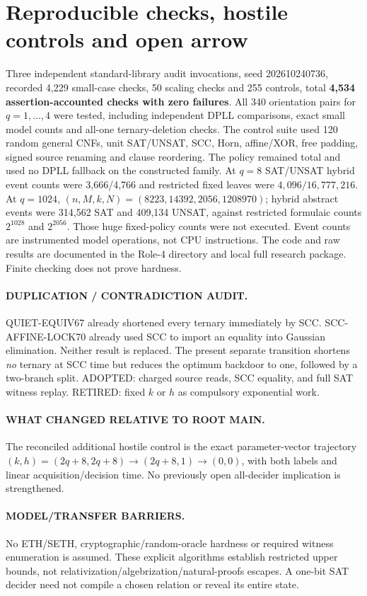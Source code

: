 \documentclass[11pt]{article}
\begin{document}
\section{Reproducible checks, hostile controls and open arrow}
Three independent standard-library audit invocations, seed
202610240736, recorded 4,229 small-case checks,
50 scaling checks and 255 controls, total
\textbf{4,534 assertion-accounted checks with zero failures}.
All 340 orientation pairs for $q=1,\ldots,4$ were tested, including
independent DPLL comparisons, exact small model counts and
all-one ternary-deletion checks. The control suite used 120
random general CNFs, unit SAT/UNSAT, SCC, Horn, affine/XOR,
free padding, signed source renaming and clause reordering.
The policy remained total and used no DPLL fallback on the constructed
family. At $q=8$ SAT/UNSAT hybrid event counts were
3,666/4,766 and restricted fixed leaves were
$4,096/16,777,216$. At $q=1024$,
$(n,M,k,N)=(8223,14392,2056,1208970)$;
hybrid abstract events were 314,562 SAT and 409,134 UNSAT,
against restricted formulaic counts $2^{1028}$ and $2^{2056}$.
Those huge fixed-policy counts were not executed. Event counts
are instrumented model operations, not CPU instructions.
The code and raw results are documented in the Role-4 directory
and local full research package. Finite checking does not prove hardness.

\paragraph{DUPLICATION / CONTRADICTION AUDIT.}
QUIET-EQUIV67 already shortened every ternary immediately by SCC.
SCC-AFFINE-LOCK70 already used SCC to import an equality into
Gaussian elimination. Neither result is replaced. The present
separate transition shortens \emph{no} ternary at SCC time but
reduces the optimum backdoor to one, followed by a two-branch split.
ADOPTED: charged source reads, SCC equality, and full SAT witness
replay. RETIRED: fixed $k$ or $h$ as compulsory exponential work.
\paragraph{WHAT CHANGED RELATIVE TO ROOT MAIN.}
The reconciled additional hostile control is the exact parameter-vector
trajectory $(k,h)=(2q+8,2q+8)\to(2q+8,1)\to(0,0)$,
with both labels and linear acquisition/decision time.
No previously open all-decider implication is strengthened.
\paragraph{MODEL/TRANSFER BARRIERS.}
No ETH/SETH, cryptographic/random-oracle hardness or required
witness enumeration is assumed. These explicit algorithms establish
restricted upper bounds, not relativization/algebrization/natural-proofs
escapes. A one-bit SAT decider need not compile a chosen relation
or reveal its entire state.
\end{document}
